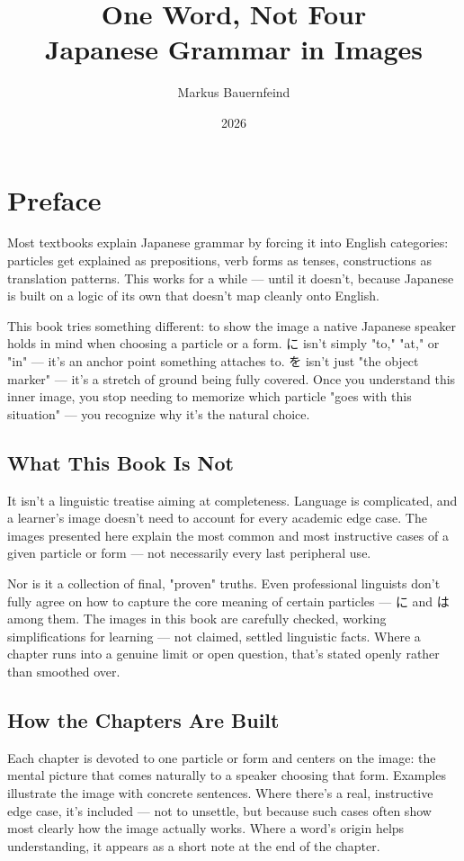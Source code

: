 \documentclass[12pt]{book}
\title{One Word, Not Four\\\large Japanese Grammar in Images}
\author{Markus Bauernfeind}
\date{2026}
\begin{document}
\pagestyle{plain}
\maketitle
\tableofcontents

\chapter{Preface}

Most textbooks explain Japanese grammar by forcing it into English categories: particles get explained as prepositions, verb forms as tenses, constructions as translation patterns. This works for a while — until it doesn't, because Japanese is built on a logic of its own that doesn't map cleanly onto English.

This book tries something different: to show the image a native Japanese speaker holds in mind when choosing a particle or a form. に isn't simply "to," "at," or "in" — it's an anchor point something attaches to. を isn't just "the object marker" — it's a stretch of ground being fully covered. Once you understand this inner image, you stop needing to memorize which particle "goes with this situation" — you recognize why it's the natural choice.

\section*{What This Book Is Not}

It isn't a linguistic treatise aiming at completeness. Language is complicated, and a learner's image doesn't need to account for every academic edge case. The images presented here explain the most common and most instructive cases of a given particle or form — not necessarily every last peripheral use.

Nor is it a collection of final, "proven" truths. Even professional linguists don't fully agree on how to capture the core meaning of certain particles — に and は among them. The images in this book are carefully checked, working simplifications for learning — not claimed, settled linguistic facts. Where a chapter runs into a genuine limit or open question, that's stated openly rather than smoothed over.

\section*{How the Chapters Are Built}

Each chapter is devoted to one particle or form and centers on the image: the mental picture that comes naturally to a speaker choosing that form. Examples illustrate the image with concrete sentences. Where there's a real, instructive edge case, it's included — not to unsettle, but because such cases often show most clearly how the image actually works. Where a word's origin helps understanding, it appears as a short note at the end of the chapter.
\end{document}
